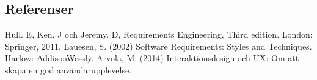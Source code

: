 \subsection{Referenser}

\vspace{-9mm}
\begin{thebibliography}{9}
Hull. E, Ken. J och Jeremy. D, Requirements Engineering, Third edition. London: Springer, 2011.
Lauesen, S. (2002) Software Requirements: Styles and Techniques. Harlow: AddisonWessly.
Arvola, M. (2014) Interaktionsdesign och UX: Om att skapa en god användarupplevelse. %
\end{thebibliography}

